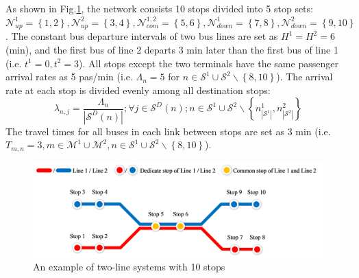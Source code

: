 \documentclass[smallextended]{svjour3}       %
\begin{document}
\begin{Abstract}
As shown in Fig.\ref{fig:example}, the network consists 10 stops divided into 5 stop sets:
$\mathcal{N}_{up}^{1}=\left\{1,2\right\},
\mathcal{N}_{up}^{2}=\left\{3,4\right\},
\mathcal{N}_{com}^{1,2}=\left\{5,6\right\},
\mathcal{N}_{down}^{1}=\left\{7,8\right\},
\mathcal{N}_{down}^{2}=\left\{9,10\right\}$. 
The constant bus departure intervals of two bus lines are set as $H^{1}=H^{2}=6$ (min), 
and the first bus of line 2 departs 3 min later than the first bus of line 1 
(i.e. $t^{1}=0,t^{2}=3$). 
All stops except the two terminals have the same passenger arrival rates as 5 pas/min 
(i.e. $\Lambda_{n}=5$ for $n\in \mathcal{S}^{1}\cup\mathcal{S}^{2}\backslash\left\{8,10\right\}$).
The arrival rate at each stop is divided evenly among all destination stops:
\begin{equation}
    \label{equ:lambda}
    \lambda_{n,j} = \frac{\Lambda_{n}}{\left|\mathcal{S}^{D}(n)\right|};
    \forall j\in \mathcal{S}^{D}(n);n\in\mathcal{S}^{1}\cup\mathcal{S}^{2}\backslash\left\{n^{1}_{\left|\mathcal{S}^{1}\right|},n^{2}_{\left|\mathcal{S}^{2}\right|}\right\}
\end{equation}
The travel times for all buses in each link between stops are set as 3 min 
(i.e. $T_{m,n}=3,m\in\mathcal{M}^{1}\cup \mathcal{M}^{2},n\in \mathcal{S}^{1}\cup\mathcal{S}^{2}\backslash \left\{8,10\right\}$).
\begin{figure}[H]
    \centering
    \includegraphics[width=1\linewidth]{CASPT2021paper_fig/Fig2.png}
    \caption{An example of two-line systems with 10 stops}
    \label{fig:example}
\end{figure}


\end{Abstract}
\end{document}
